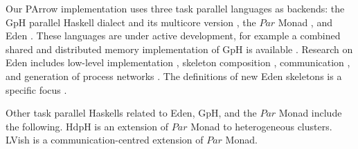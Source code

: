\documentclass{jfp1}
\newcommand{\Conid}[1]{\mathit{#1}}
\renewcommand{\cite}[1]{\citep{#1}}
\begin{document}
Our PArrow implementation uses three task parallel languages as backends: the GpH \cite{Trinder1996,Trinder1998a} parallel Haskell dialect and its multicore version \cite{Marlow2009}, the \ensuremath{\Conid{Par}} Monad \cite{par-monad,Foltzer:2012:MPC:2398856.2364562}, and Eden \cite{eden,Loogen2012}. These languages are under active development, for example a combined shared and distributed memory implementation of GpH is available \cite{Aljabri:2013:DIG:2620678.2620682,Aljabri2015}.
Research on Eden includes low-level  implementation
\cite{JostThesis,berthold_loidl_hammond_2016}, skeleton composition
\cite{dieterle_horstmeyer_loogen_berthold_2016}, communication \cite{Dieterle2010}, and generation of process networks \cite{Horstmeyer2013}. The definitions of new Eden skeletons is a specific focus \cite{doi:10.1142/S0129626403001380,Eden:PARCO05,Berthold2009-mr,Berthold2009-fft,dieterle2010skeleton,delaEncina2011,Dieterle2013,janjic2013space}.

Other task parallel Haskells related to Eden, GpH, and the \ensuremath{\Conid{Par}} Monad include the following.  
HdpH \cite{Maier:2014:HDS:2775050.2633363,stewart_maier_trinder_2016} is an extension of \ensuremath{\Conid{Par}} Monad to
heterogeneous clusters. LVish \cite{Kuper:2014:TPE:2666356.2594312} is a communication-centred extension
of \ensuremath{\Conid{Par}} Monad.
\end{document}
